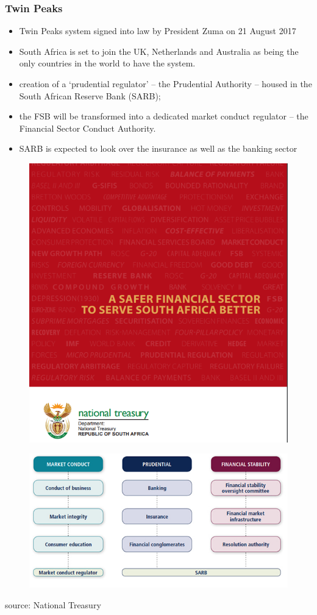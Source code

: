\documentclass[11pt]{beamer}
\begin{document}
\begin{frame}
\frametitle{Twin Peaks}
\begin{itemize}
\item Twin Peaks system signed into law by President Zuma on 21 August 2017
\item South Africa is set to join the UK, Netherlands and Australia as being the only countries in the world to have the system.
\item creation of a  ‘prudential regulator’ – the Prudential Authority – housed in the South African Reserve Bank (SARB);
\item the FSB will be transformed into a dedicated market conduct regulator – the Financial Sector Conduct Authority.
\item SARB is expected to look over the insurance as well as the banking sector
\end{itemize}

\end{frame}

\begin{frame}
\begin{figure}
\includegraphics[width=0.7 \textwidth]{Redbook.png}
\end{figure}
\end{frame}


\begin{frame}
\begin{figure}
\includegraphics[width=1 \textwidth]{TwinPeak1}
\end{figure}
\tiny{source: National Treasury}
\end{frame}
\end{document}
